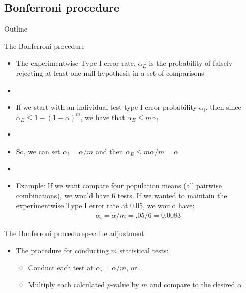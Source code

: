 \documentclass[xcolor=dvipsnames]{beamer}
\begin{document}
\subsection{Bonferroni procedure}

\begin{frame}{Outline}
	\tableofcontents[currentsection,subsectionstyle=show/shaded/hide]
\end{frame}

\begin{frame}{The Bonferroni procedure}
	\begin{itemize}
		\item The experimentwise Type I error rate, $\alpha_E$ is the probability of falsely rejecting at least one null hypothesis in a set of comparisons
		\item[]
		\item If we start with an individual test type I error probability $\alpha_i$, then since $\alpha_E\leq 1-(1-\alpha)^m$, we have that $\alpha_E\leq m \alpha_i$
		\item[]
		\item So, we can set $\alpha_i = \alpha / m$ and then $\alpha_E \leq m \alpha / m = \alpha$ 
		\item[]
		\item Example: If we want compare four population means (all pairwise combinations), we would have 6 tests. If we wanted to maintain the experimentwise Type I error rate at 0.05, we would have:
		\begin{gather*}
			\alpha_i = \alpha / m = .05 / 6 = 0.0083
		\end{gather*}
	\end{itemize}
\end{frame}

\begin{frame}{The Bonferroni procedure}{p-value adjustment }
	\begin{itemize}
		\item The procedure for conducting $m$ statistical tests:
		\begin{itemize}
			\item Conduct each test at $\alpha_i = \alpha / m$, or...
			\item Multiply each calculated $p$-value by $m$ and compare to the desired $\alpha$
		\end{itemize}
	\end{itemize}
\end{frame}
\end{document}

